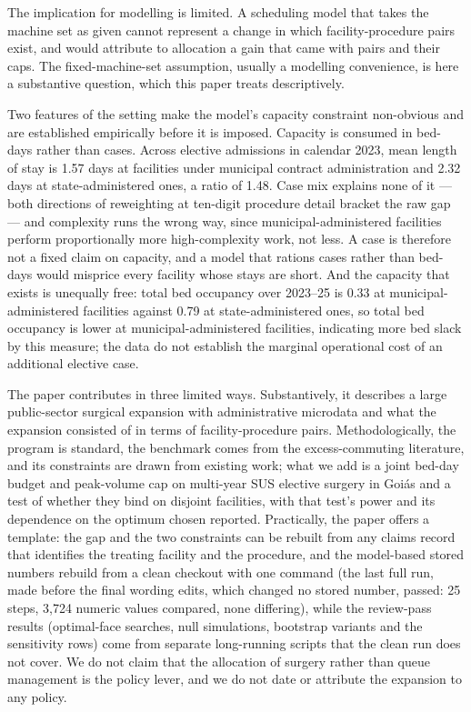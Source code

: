 The implication for modelling is limited. A scheduling model that takes the machine set as given cannot represent a change in which
facility-procedure pairs exist, and would attribute to allocation a gain that came with pairs and their caps. The
fixed-machine-set assumption, usually a modelling convenience, is here a substantive question, which this paper treats descriptively.

Two features of the setting make the model's capacity constraint non-obvious and
are established empirically before it is imposed. Capacity is consumed in
bed-days rather than cases. Across elective admissions in calendar 2023, mean
length of stay is 1.57 days at facilities under municipal contract
administration and 2.32 days at state-administered ones, a ratio of 1.48. Case
mix explains none of it --- both directions of reweighting at ten-digit
procedure detail bracket the raw gap --- and complexity runs the wrong way,
since municipal-administered facilities perform proportionally more
high-complexity work, not less. A case is therefore not a fixed claim on
capacity, and a model that rations cases rather than bed-days would misprice
every facility whose stays are short. And the capacity that exists is unequally
free: total bed occupancy over 2023--25 is 0.33 at municipal-administered
facilities against 0.79 at state-administered ones, so
total bed occupancy is lower at municipal-administered facilities, indicating more bed slack by this measure; the data do not establish the marginal operational cost of an additional elective case.

The paper contributes in three limited ways. Substantively, it describes a large public-sector surgical expansion with
administrative microdata and what the expansion consisted of in terms of facility-procedure pairs. Methodologically, the program is
standard, the benchmark comes from the excess-commuting literature, and its constraints are drawn from existing work; what we add is a
joint bed-day budget and peak-volume cap on multi-year SUS elective surgery in Goi\'as and a test of whether they bind on disjoint facilities, with that test's power and
its dependence on the optimum chosen reported. Practically, the paper offers a template: the gap and the two constraints can be
rebuilt from any claims record that identifies the treating facility and the procedure, and the model-based stored numbers rebuild from a clean checkout with one command (the last full run, made before the final wording edits, which changed no stored number, passed: 25 steps, 3{,}724 numeric values compared, none differing), while the review-pass results (optimal-face searches, null simulations, bootstrap variants and the sensitivity rows) come from separate long-running scripts that the clean run does not cover. We do not claim that the allocation of surgery rather than queue management is the policy lever, and we do not date
or attribute the expansion to any policy.


